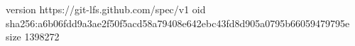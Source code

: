 version https://git-lfs.github.com/spec/v1
oid sha256:a6b06fdd9a3ae2f50f5acd58a79408e642ebc43fd8d905a0795b66059479795e
size 1398272
